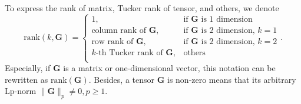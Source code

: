 \documentclass[twoside,11pt]{article}
\def\rank{\text{rank}}
\def\tvar#1{\mathbf{#1}} %
\begin{document}
To express the rank of matrix, Tucker rank \citep{Sidiropoulos2017} of tensor, and others, we denote
\begin{equation}
  \rank(k, \tvar{G}) =
  \left\{\begin{array}{ll}
    1,                                    & \text{if } \tvar{G} \text{ is 1 dimension}         \\
    \text{column rank of } \tvar{G},      & \text{if } \tvar{G} \text{ is 2 dimension, } k = 1 \\
    \text{row rank of } \tvar{G},         & \text{if } \tvar{G} \text{ is 2 dimension, } k = 2 \\
    k\text{-th Tucker rank of } \tvar{G}, & \text{others}                                      \\
  \end{array}\right. .
\end{equation}
Especially, if \(\tvar{G}\) is a matrix or one-dimensional vector, this notation can be rewritten as \(\rank(\tvar{G})\).
Besides, a tensor \(\tvar{G}\) is non-zero means that its arbitrary Lp-norm \(\| \tvar{G} \|_p \ne 0, p \ge 1\).
\end{document}
